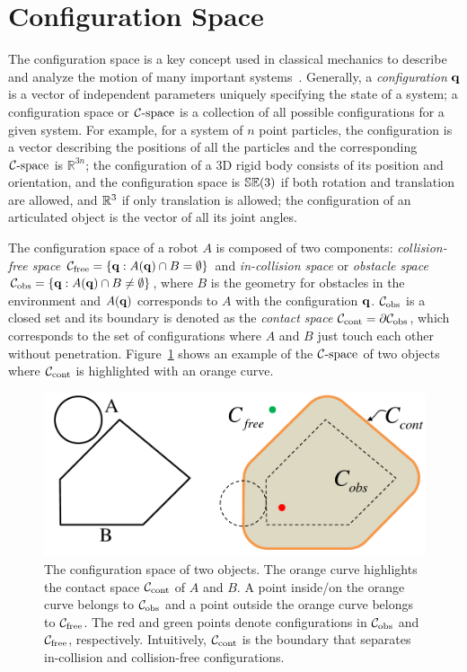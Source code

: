 \section{Configuration Space}
\label{sec:1:configurationSpace}
The configuration space is a key concept used in classical mechanics to describe and analyze the motion of many important systems~\cite{Arnold:1989}. Generally, a \emph{configuration} $\mathbf q$ is a vector of independent parameters uniquely specifying the state of a system; a configuration space or $\mathcal C\text{-space}$ is a collection of all possible configurations for a given system. For example, for a system of $n$ point particles, the configuration is a vector describing the positions of all the particles and the corresponding $\mathcal C\text{-space}$ is $\mathbb R^{3n}$; the configuration of a 3D rigid body consists of its position and orientation, and the configuration space is $\mathbb {SE}(3)$ if both rotation and translation are allowed, and $\mathbb R^3$ if only translation is allowed; the configuration of an articulated object is the vector of all its joint angles.

The configuration space of a robot $A$ is composed of two components: \emph{collision-free space} $\mathcal C_{\text{free}} = \{\mathbf q: A(\mathbf q) \cap B = \emptyset\}$ and \emph{in-collision space} or \emph{obstacle space} $\mathcal C_{\text{obs}} = \{\mathbf q: A(\mathbf q) \cap B \neq \emptyset\}$, where $B$ is the geometry for obstacles in the environment and $A(\mathbf q)$ corresponds to $A$ with the configuration $\mathbf q$. $\mathcal C_{\text{obs}}$ is a closed set and its boundary is denoted as the \emph{contact space} $\mathcal C_\text{cont} = \partial \mathcal C_{\text{obs}}$, which corresponds to the set of configurations where $A$ and $B$ just touch each other without penetration. Figure~\ref{fig:1:contactspace} shows an example of the $\mathcal C\text{-space}$ of two objects where $\mathcal C_\text{cont}$ is highlighted with an orange curve.

\begin{figure}[htb]
  \centering
  \includegraphics[width=0.6\linewidth]{figs/1/Ccont.pdf}
  \caption[The configuration space of two objects]{The configuration space of two objects. The orange curve highlights the contact space $\mathcal C_\text{cont}$ of $A$ and $B$. A point inside/on the orange curve belongs to
  $\mathcal C_{\text{obs}}$ and a point outside the orange curve belongs to $\mathcal C_{\text{free}}$.
  The red and green points denote configurations in $\mathcal C_{\text{obs}}$ and $\mathcal C_{\text{free}}$, respectively. Intuitively, $\mathcal C_\text{cont}$ is the boundary that separates in-collision and collision-free configurations.}
  \label{fig:1:contactspace}
\end{figure}

